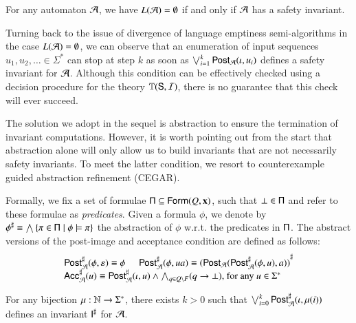 \documentclass[10pt,conference,letterpaper,twocolumn]{IEEEtran}
\begin{document}
\begin{lemma}\label{lemma:safety-invariant}
  For any automaton $\mathcal{A}$, we have $L(\mathcal{A}) = \emptyset$ if and only if
  $\mathcal{A}$ has a safety invariant.
\end{lemma}

Turning back to the issue of divergence of language emptiness
semi-algorithms in the case $L(\mathcal{A}) = \emptyset$, we can observe that
an enumeration of input sequences $u_1,u_2,\ldots \in \Sigma^*$ can
stop at step $k$ as soon as $\bigvee_{i=1}^k \mathsf{Post}_{\mathcal{A}}(\iota,u_i)$
defines a safety invariant for $\mathcal{A}$. Although this condition can be
effectively checked using a decision procedure for the theory
$\mathbb{T}(\mathsf{S},\mathcal{I})$, there is no guarantee that this check will ever
succeed.

The solution we adopt in the sequel is abstraction to ensure the
termination of invariant computations. However, it is worth pointing
out from the start that abstraction alone will only allow us to build
invariants that are not necessarily safety invariants. To meet the
latter condition, we resort to counterexample guided abstraction
refinement (CEGAR).

Formally, we fix a set of formulae $\mathsf{\Pi} \subseteq
\mathsf{Form}(Q,\mathbf x)$, such that $\bot \in \mathsf{\Pi}$ and refer to these
formulae as \emph{predicates}. Given a formula $\phi$, we denote by
${\phi}^\sharp \equiv \bigwedge \left\{ \pi \in \mathsf{\Pi} \mid \phi \models
  \pi \right\}$ the abstraction of $\phi$ w.r.t. the predicates in
$\mathsf{\Pi}$. The abstract versions of the post-image and acceptance
condition are defined as follows:
\[\begin{array}{l}
{\mathsf{Post}}^\sharp_{\mathcal{A}}(\phi,\varepsilon) \equiv \phi \hspace*{5mm}
{\mathsf{Post}}^\sharp_{\mathcal{A}}(\phi,ua) \equiv {(\mathsf{Post}_{\mathcal{A}}({\mathsf{Post}}^\sharp_{\mathcal{A}}(\phi,u),a))}^\sharp \\
{\mathsf{Acc}}^\sharp_{\mathcal{A}}(u) \equiv {\mathsf{Post}}^\sharp_{\mathcal{A}}(\iota,u) \wedge \bigwedge_{q \in Q \setminus F} 
(q \rightarrow \bot)\text{, for any $u \in \Sigma^*$}
\end{array}\]

\begin{lemma}\label{lemma:abstract-invariant}
  For any bijection $\mu : {\bf \mathbb{N}} \rightarrow \Sigma^*$, there exists
  $k>0$ such that $\bigvee_{i=0}^k {\mathsf{Post}}^\sharp_{\mathcal{A}}(\iota,\mu(i))$ defines
  an invariant ${\mathsf{I}}^\sharp$ for $\mathcal{A}$. 
\end{lemma}

\end{document}
